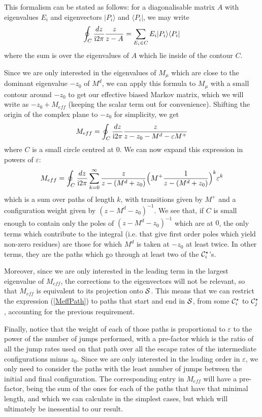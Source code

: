 \documentclass[aps,pre,onecolumn,showpacs,showkeys,a4paper]{revtex4-1}
\begin{document}
This formalism can be stated as follows: for a diagonalisable matrix $A$ with eigenvalues $E_i$ and eigenvectors $ |P_i\rangle$ and $\langle P_i|$, we may write
\begin{equation}\label{IV-3-Eproj}
\oint_{C}\frac{dz}{{\rm i} 2\pi}\frac{z}{z-A}=\sum\limits_{E_i\in C} E_i|P_i\rangle\langle P_i|
\end{equation}
where the sum is over the eigenvalues of $A$ which lie inside of the contour $C$.

Since we are only interested in the eigenvalues of $M_\mu$ which are close to the dominant eigenvalue $-z_0$ of $M^d$, we can apply this formula to $M_\mu$ with a small contour around $-z_0$ to get our effective biased Markov matrix, which we will write as $-z_0+M_{eff}$ (keeping the scalar term out for convenience). Shifting the origin of the complex plane to $-z_0$ for simplicity, we get
\begin{equation}\label{IV-3-Eproj2}
M_{eff}=\oint_{C}\frac{dz}{{\rm i} 2\pi}\frac{z}{z-z_0-M^d-\varepsilon M^+}
\end{equation}
where $C$ is a small circle centred at $0$. We can now expand this expression in powers of $\varepsilon$:
\begin{equation}\label{MeffPath}
M_{eff}=\oint_{C}\frac{dz}{{\rm i} 2\pi} \sum\limits_{k=0}^{\infty}\frac{z}{z-(M^d+z_0)}\Bigl(M^+ \frac{1}{z-(M^d+z_0)} \Bigr)^k \varepsilon ^k
\end{equation}
which is a sum over paths of length $k$, with transitions given by $M^+$ and a configuration weight given by $(z-M^d-z_0)^{-1}$. We see that, if $C$ is small enough to contain only the poles of $(z-M^d-z_0)^{-1}$ which are at $0$, the only terms which contribute to the integral (i.e. that give first order poles which yield non-zero residues) are those for which $M^d$ is taken at $-z_0$ at least twice. In other terms, they are the paths which go through at least two of the ${\cal C}_i^\star$'s.

Moreover, since we are only interested in the leading term in the largest eigenvalue of $M_{eff}$, the corrections to the eigenvectors will not be relevant, so that $M_{eff}$ is equivalent to its projection onto ${\cal S}$. This means that we can restrict the expression (\ref{MeffPath}) to paths that start and end in ${\cal S}$, from some ${\cal C}_i^\star$ to ${\cal C}_j^\star$, accounting for the previous requirement. 

Finally, notice that the weight of each of those paths is proportional to $\varepsilon$ to the power of the number of jumps performed, with a pre-factor which is the ratio of all the jump rates used on that path over all the escape rates of the intermediate configurations minus $z_0$. Since we are only interested in the leading order in $\varepsilon$, we only need to consider the paths with the least number of jumps between the initial and final configuration. The corresponding entry in $M_{eff}$ will have a pre-factor, being the sum of the ones for each of the paths that have that minimal length, and which we can calculate in the simplest cases, but which will ultimately be inessential to our result.
\end{document}
